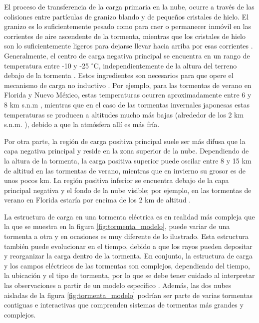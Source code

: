 \documentclass[12pt,oneside,openany,letter]{book}
\begin{document}
El proceso de transferencia de la carga primaria en la nube, ocurre a través de las colisiones entre partículas de granizo blando y de pequeños cristales de hielo. El granizo es lo suficientemente pesado como para caer o permanecer inmóvil en las corrientes de aire ascendente de la tormenta, mientras que los cristales de hielo son lo suficientemente ligeros para dejarse llevar hacia arriba por esas corrientes \cite{DwyerUman2014}. Generalmente, el centro de carga negativa principal se encuentra en un rango de temperatura entre -10 y -25 $^{\circ}$C, independientemente de la altura del terreno debajo de la tormenta \cite{RakovEtal2003}. Estos ingredientes son necesarios para que opere el mecanismo de carga no inductivo \cite{MacgormanEtal1998}. Por ejemplo, para las tormentas de verano en Florida y Nuevo México, estas temperaturas ocurren aproximadamente entre 6 y 8 km s.n.m \cite{DwyerUman2014}, mientras que en el caso de las tormentas invernales japonesas estas temperaturas se producen a altitudes mucho más bajas (alrededor de los 2 km s.n.m. \cite{KrehbielEtal1986}), debido a que la atmósfera allí es más fría. 

Por otra parte, la región de carga positiva principal suele ser más difusa que la capa negativa principal y reside en la zona superior de la nube. Dependiendo de la altura de la tormenta, la carga positiva superior puede oscilar entre 8 y 15 km de altitud en las tormentas de verano, mientras que en invierno su grosor es de unos pocos km. La región positiva inferior se encuentra debajo de la capa principal negativa y el fondo de la nube visible; por ejemplo, en las tormentas de verano en Florida estaría por encima de los 2 km de altitud \cite{DwyerUman2014}. 

La estructura de carga en una tormenta eléctrica es en realidad más compleja que la que se muestra en la figura \ref{fig:tormenta_modelo}, puede variar de una tormenta a otra y en ocasiones es muy diferente de lo ilustrado. Esta estructura también puede evolucionar en el tiempo, debido a que los rayos pueden depositar y reorganizar la carga dentro de la tormenta. En conjunto, la estructura de carga y los campos eléctricos de las tormentas son complejos, dependiendo del tiempo, la ubicación y el tipo de tormenta, por lo que se debe tener cuidado al interpretar las observaciones a partir de un modelo específico \cite{DwyerUman2014}. Además, las dos nubes aisladas de la figura \ref{fig:tormenta_modelo} podrían ser parte de varias tormentas contiguas e interactivas que comprenden sistemas de tormentas más grandes y complejos. 
\end{document}
